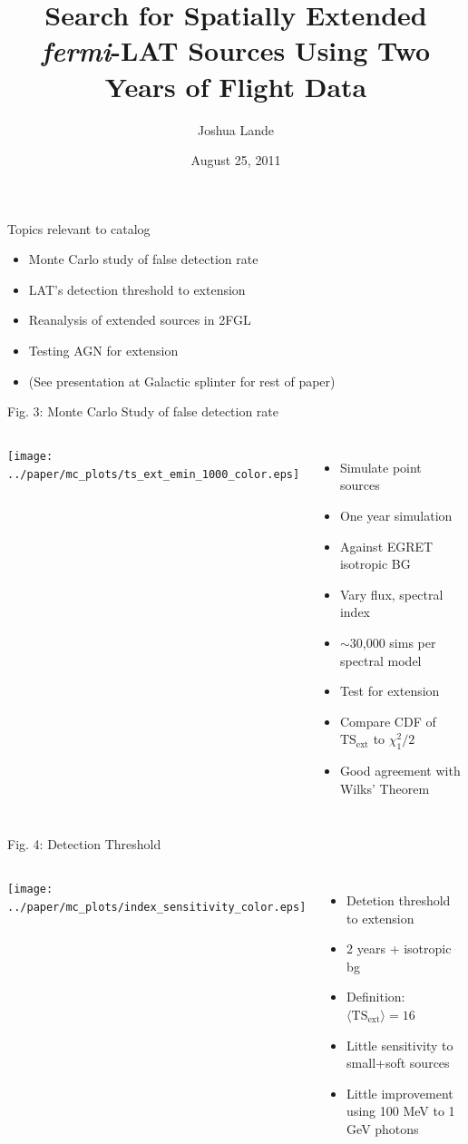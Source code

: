 \documentclass[12pt]{beamer}
\title{Search for Spatially Extended \textit{fermi}-LAT Sources Using Two Years of Flight
Data}
\author{Joshua Lande}
\institute{SLAC/Stanford}
\date{August 25, 2011}
\begin{document}


\begin{frame}{Topics relevant to catalog}
  \begin{itemize}
        \item Monte Carlo study of false detection rate 
        \item LAT's detection threshold to extension
        \item Reanalysis of extended sources in 2FGL
        \item Testing AGN for extension
        \item (See presentation at Galactic splinter for rest of paper)
  \end{itemize}
\end{frame}

\begin{frame}{Fig. 3: Monte Carlo Study of false detection rate}
  \begin{columns}
    \texttt{[image: ../paper/mc\_plots/ts\_ext\_emin\_1000\_color.eps]}
    \begin{itemize}
      \item Simulate point sources
      \item One year simulation
      \item Against EGRET isotropic BG
      \item Vary flux, spectral index
      \item $\sim$30,000 sims per spectral model
      \item Test for extension
      \item Compare CDF of $\text{TS}_\text{ext}$ to $\chi^2_1/2$
      \item Good agreement with Wilks' Theorem
    \end{itemize}
  \end{columns}
\end{frame}

\begin{frame}{Fig. 4: Detection Threshold}
  \begin{columns}
    \texttt{[image: ../paper/mc\_plots/index\_sensitivity\_color.eps]}
    \begin{itemize}
      \item Detetion threshold to extension
      \item 2 years + isotropic bg
      \item Definition: $\langle\text{TS}_\text{ext}\rangle=16$
      \item Little sensitivity to small+soft sources
      \item Little improvement using 100 MeV to 1 GeV photons
    \end{itemize}
  \end{columns}
\end{frame}
\end{document}
